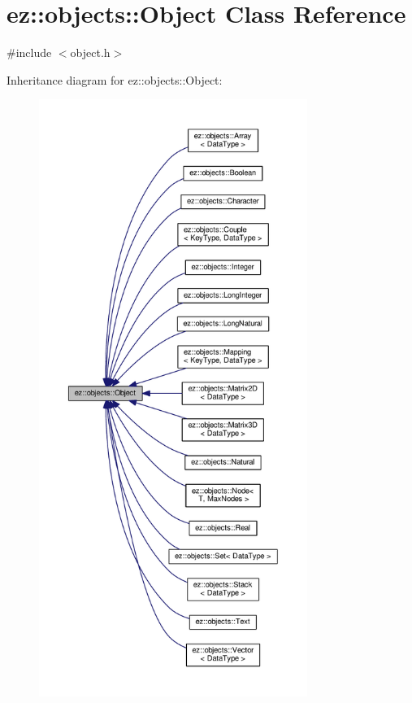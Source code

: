 \hypertarget{classez_1_1objects_1_1Object}{}\section{ez\+:\+:objects\+:\+:Object Class Reference}
\label{classez_1_1objects_1_1Object}


{\ttfamily \#include $<$object.\+h$>$}



Inheritance diagram for ez\+:\+:objects\+:\+:Object\+:
\nopagebreak
\begin{figure}[H]
\begin{center}
\leavevmode
\includegraphics[height=550pt]{classez_1_1objects_1_1Object__inherit__graph}
\end{center}
\end{figure}
